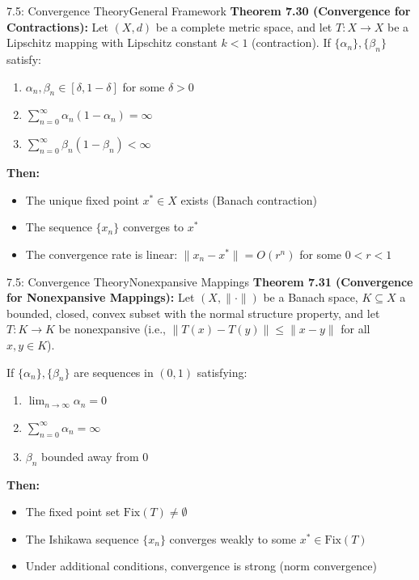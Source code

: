 \documentclass[aspectratio=169,10pt]{beamer}
\begin{document}
\begin{frame}{7.5: Convergence Theory}{General Framework}
\textbf{Theorem 7.30 (Convergence for Contractions):}
Let $(X, d)$ be a complete metric space, and let $T: X \to X$ be a Lipschitz mapping with Lipschitz constant $k < 1$ (contraction). If $\{\alpha_n\}, \{\beta_n\}$ satisfy:

\begin{enumerate}
    \item $\alpha_n, \beta_n \in [\delta, 1-\delta]$ for some $\delta > 0$
    \item $\sum_{n=0}^{\infty} \alpha_n (1 - \alpha_n) = \infty$
    \item $\sum_{n=0}^{\infty} \beta_n (1 - \beta_n) < \infty$
\end{enumerate}

\vspace{0.2cm}

\textbf{Then:}
\begin{itemize}
    \item The unique fixed point $x^* \in X$ exists (Banach contraction)
    \item The sequence $\{x_n\}$ converges to $x^*$
    \item The convergence rate is linear: $\|x_n - x^*\| = O(r^n)$ for some $0 < r < 1$
\end{itemize}
\end{frame}

\begin{frame}{7.5: Convergence Theory}{Nonexpansive Mappings}
\textbf{Theorem 7.31 (Convergence for Nonexpansive Mappings):}
Let $(X, \|\cdot\|)$ be a Banach space, $K \subseteq X$ a bounded, closed, convex subset with the normal structure property, and let $T: K \to K$ be nonexpansive (i.e., $\|T(x) - T(y)\| \leq \|x - y\|$ for all $x, y \in K$).

\vspace{0.2cm}

If $\{\alpha_n\}, \{\beta_n\}$ are sequences in $(0,1)$ satisfying:
\begin{enumerate}
    \item $\lim_{n \to \infty} \alpha_n = 0$
    \item $\sum_{n=0}^{\infty} \alpha_n = \infty$
    \item $\beta_n$ bounded away from 0
\end{enumerate}

\vspace{0.2cm}

\textbf{Then:}
\begin{itemize}
    \item The fixed point set $\text{Fix}(T) \neq \emptyset$
    \item The Ishikawa sequence $\{x_n\}$ converges weakly to some $x^* \in \text{Fix}(T)$
    \item Under additional conditions, convergence is strong (norm convergence)
\end{itemize}
\end{frame}
\end{document}
